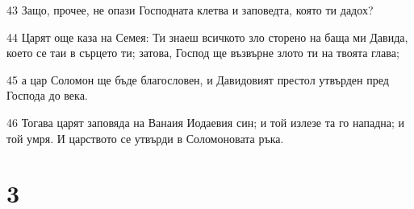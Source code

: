 \par 43 Защо, прочее, не опази Господната клетва и заповедта, която ти дадох?
\par 44 Царят още каза на Семея: Ти знаеш всичкото зло сторено на баща ми Давида, което се таи в сърцето ти; затова, Господ ще възвърне злото ти на твоята глава;
\par 45 а цар Соломон ще бъде благословен, и Давидовият престол утвърден пред Господа до века.
\par 46 Тогава царят заповяда на Ванаия Иодаевия син; и той излезе та го нападна; и той умря. И царството се утвърди в Соломоновата ръка.

\chapter{3}

